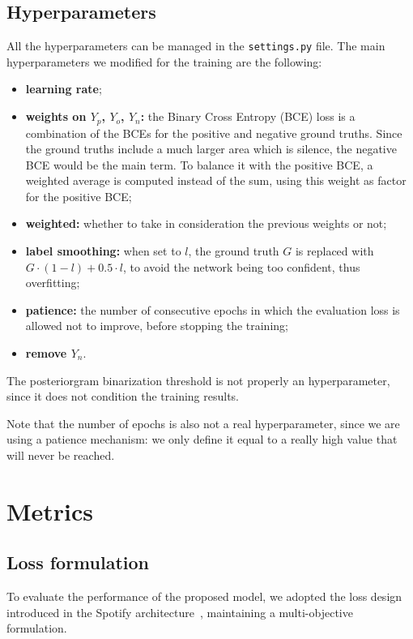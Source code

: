 \documentclass[10pt,twocolumn,letterpaper]{article}
\begin{document}
\subsection{Hyperparameters}

All the hyperparameters can be managed in the \texttt{settings.py} file. The main hyperparameters we modified for the training are the following:

\begin{itemize}
    \item \textbf{learning rate};
    \item \textbf{weights on $Y_p$, $Y_o$, $Y_n$:} the Binary Cross Entropy (BCE) loss is a combination of the BCEs for the positive and negative ground truths. Since the ground truths include a much larger area which is silence, the negative BCE would be the main term. To balance it with the positive BCE, a weighted average is computed instead of the sum, using this weight as factor for the positive BCE;
    \item \textbf{weighted:} whether to take in consideration the previous weights or not;
    \item \textbf{label smoothing:} when set to $l$, the ground truth $G$ is replaced with $G{\cdot}(1-l)+0.5{\cdot}l$, to avoid the network being too confident, thus overfitting;
    \item \textbf{patience:} the number of consecutive epochs in which the evaluation loss is allowed not to improve, before stopping the training;
    \item \textbf{remove $Y_n$}.
\end{itemize}

The posteriorgram binarization threshold is not properly an hyperparameter, since it does not condition the training results.

Note that the number of epochs is also not a real hyperparameter, since we are using a patience mechanism: we only define it equal to a really high value that will never be reached. 

\section{Metrics}\label{sec:metrics}

\subsection{Loss formulation}

To evaluate the performance of the proposed model, we adopted the loss design introduced in the Spotify architecture~\cite{spoty-audio}, maintaining a multi-objective formulation.
\end{document}
